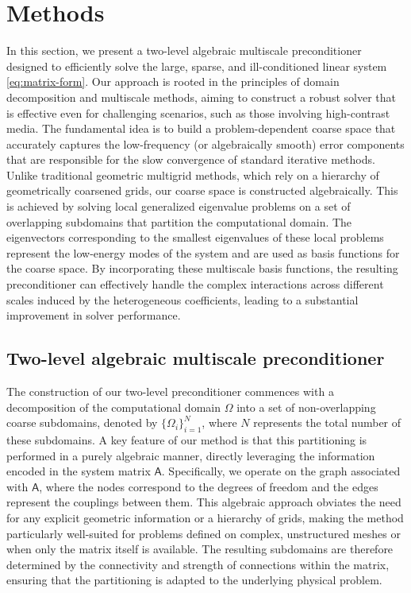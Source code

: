 \documentclass[preprint,12pt]{elsarticle}
\begin{document}
  \section{Methods}
  \label{sec:methods} In this section, we present a two-level algebraic
  multiscale preconditioner designed to efficiently solve the large, sparse, and
  ill-conditioned linear system \eqref{eq:matrix-form}. Our approach is rooted
  in the principles of domain decomposition and multiscale methods, aiming to construct
  a robust solver that is effective even for challenging scenarios, such as
  those involving high-contrast media. The fundamental idea is to build a problem-dependent
  coarse space that accurately captures the low-frequency (or algebraically
  smooth) error components that are responsible for the slow convergence of standard
  iterative methods. Unlike traditional geometric multigrid methods, which rely on
  a hierarchy of geometrically coarsened grids, our coarse space is constructed
  algebraically. This is achieved by solving local generalized eigenvalue problems
  on a set of overlapping subdomains that partition the computational domain.
  The eigenvectors corresponding to the smallest eigenvalues of these local
  problems represent the low-energy modes of the system and are used as basis
  functions for the coarse space. By incorporating these multiscale basis functions,
  the resulting preconditioner can effectively handle the complex interactions
  across different scales induced by the heterogeneous coefficients, leading to a
  substantial improvement in solver performance.

  \subsection{Two-level algebraic multiscale preconditioner}
  The construction of our two-level preconditioner commences with a decomposition
  of the computational domain $\Omega$ into a set of non-overlapping coarse subdomains,
  denoted by $\{\Omega_{i}\}_{i=1}^{N}$, where $N$ represents the total number of
  these subdomains. A key feature of our method is that this partitioning is
  performed in a purely algebraic manner, directly leveraging the information encoded
  in the system matrix $\mathsf{A}$. Specifically, we operate on the graph associated
  with $\mathsf{A}$, where the nodes correspond to the degrees of freedom and
  the edges represent the couplings between them. This algebraic approach obviates
  the need for any explicit geometric information or a hierarchy of grids,
  making the method particularly well-suited for problems defined on complex, unstructured
  meshes or when only the matrix itself is available. The resulting subdomains
  are therefore determined by the connectivity and strength of connections
  within the matrix, ensuring that the partitioning is adapted to the underlying
  physical problem.
\end{document}
